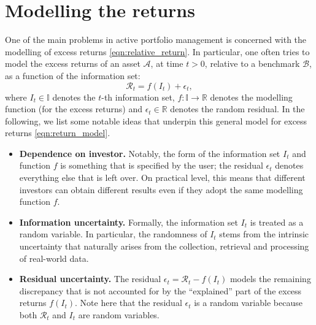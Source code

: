 \documentclass[12pt]{article}
\begin{document}
\section{Modelling the returns}
One of the main problems in active portfolio management is concerned with the modelling of excess returns \eqref{eqn:relative_return}. In particular, one often tries to model the excess returns of an asset $\mathcal{A}$, at time $t > 0$, relative to a benchmark $\mathcal{B}$, as a function of the information set:
\begin{equation}
    \mathcal{R}_t = f(I_t) + \epsilon_t,
    \label{eqn:return_model}
\end{equation}
where $I_t \in \mathbb{I}$ denotes the $t$-th information set, $f: \mathbb{I} \rightarrow \mathbb{R}$ denotes the modelling function (for the excess returns) and $\epsilon_t \in \mathbb{R}$ denotes the random residual. In the following, we list some notable ideas that underpin this general model for excess returns \eqref{eqn:return_model}.

\begin{itemize}
    \item \textbf{Dependence on investor.} Notably, the form of the information set $I_t$ and function $f$ is something that is specified by the user; the residual $\epsilon_t$ denotes everything else that is left over. On practical level, this means that different investors can obtain different results even if they adopt the same modelling function $f$. 
    \item \textbf{Information uncertainty.} Formally, the information set $I_t$ is treated as a random variable. In particular, the randomness of $I_t$ stems from the intrinsic uncertainty that naturally arises from the collection, retrieval and processing of real-world data. 
    \item \textbf{Residual uncertainty.} The residual $\epsilon_t = \mathcal{R}_t - f(I_t)$ models the remaining discrepancy that is not accounted for by the ``explained'' part of the excess returns $f(I_t)$. Note here that the residual $\epsilon_t$ is a random variable because both $\mathcal{R}_t$ and $I_t$ are random variables.
\end{itemize}
\end{document}
